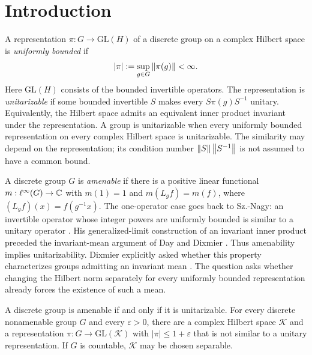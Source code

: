 \begin{abstract}
We prove that a discrete group is amenable if and only if every
uniformly bounded representation on a complex Hilbert space is similar
to a unitary representation. This resolves Dixmier's unitarizability
problem affirmatively for discrete groups.
\end{abstract}

\section{Introduction}\label{sec:introduction}

A representation \(\pi:G\to\mathrm{GL}(H)\) of a discrete group on a
complex Hilbert space is \emph{uniformly bounded} if
\[
 |\pi|:=\sup_{g\in G}\left\lVert\pi(g)\right\rVert<\infty.
\]
Here \(\mathrm{GL}(H)\) consists of the bounded invertible operators.
The representation is \emph{unitarizable} if some bounded invertible
\(S\) makes every \(S\pi(g)S^{-1}\) unitary. Equivalently, the Hilbert
space admits an equivalent inner product invariant under the
representation. A group is unitarizable when every uniformly bounded
representation on every complex Hilbert space is unitarizable. The
similarity may depend on the representation; its condition number
\(\left\lVert S\right\rVert\left\lVert S^{-1}\right\rVert\) is not assumed to have a common bound.

A discrete group \(G\) is \emph{amenable} if there is a positive linear
functional \(m:\ell^\infty(G)\to\mathbb C\) with \(m(1)=1\) and
\(m(L_gf)=m(f)\), where \((L_gf)(x)=f(g^{-1}x)\).
The one-operator case goes back to Sz.-Nagy: an invertible operator whose
integer powers are uniformly bounded is similar to a unitary operator
\cite[Theorem~I]{SzNagy1947}. His generalized-limit construction of an
invariant inner product preceded the invariant-mean argument of Day and
Dixmier \cite{Day1950,Dixmier1950}. Thus amenability implies
unitarizability. Dixmier explicitly asked whether this property
characterizes groups admitting an invariant mean
\cite[\S5, p.~221]{Dixmier1950}. The question asks whether changing the
Hilbert norm separately for every uniformly bounded representation
already forces the existence of such a mean.

\begin{theorem}\label{thm:main}
A discrete group is amenable if and only if it is unitarizable.
For every discrete nonamenable group \(G\) and every \(\varepsilon>0\),
there are a complex Hilbert space \(\mathcal K\) and a representation
\(\pi:G\to\mathrm{GL}(\mathcal K)\) with \(|\pi|\le1+\varepsilon\)
that is not similar to a unitary representation. If \(G\) is countable,
\(\mathcal K\) may be chosen separable.
\end{theorem}

